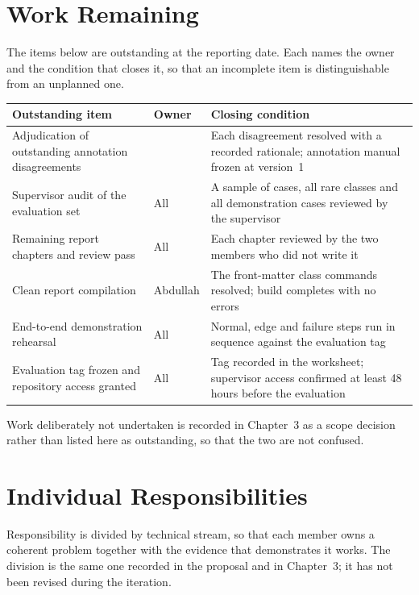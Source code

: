 \section{Work Remaining}

The items below are outstanding at the reporting date. Each names the owner and
the condition that closes it, so that an incomplete item is distinguishable
from an unplanned one.

\begin{longtable}{>{\raggedright\arraybackslash}p{}>{\raggedright\arraybackslash}p{}>{\raggedright\arraybackslash}p{}}
\toprule
Outstanding item & Owner & Closing condition \\
\midrule
\endhead
Adjudication of outstanding annotation disagreements
  & [Mishal] & Each disagreement resolved with a recorded rationale; annotation
    manual frozen at version~1 \\
Supervisor audit of the evaluation set
  & All & A sample of cases, all rare classes and all demonstration cases
    reviewed by the supervisor \\
Remaining report chapters and review pass
  & All & Each chapter reviewed by the two members who did not write it \\
Clean report compilation
  & Abdullah & The front-matter class commands resolved; build completes with no
    errors \\
End-to-end demonstration rehearsal
  & All & Normal, edge and failure steps run in sequence against the
    evaluation tag \\
Evaluation tag frozen and repository access granted
  & All & Tag recorded in the worksheet; supervisor access confirmed at
    least 48 hours before the evaluation \\
\bottomrule
\end{longtable}

\noindent Work deliberately not undertaken is recorded in Chapter~3 as a scope
decision rather than listed here as outstanding, so that the two are not
confused.

\section{Individual Responsibilities}

Responsibility is divided by technical stream, so that each member owns a
coherent problem together with the evidence that demonstrates it works. The
division is the same one recorded in the proposal and in Chapter~3; it has not
been revised during the iteration.

